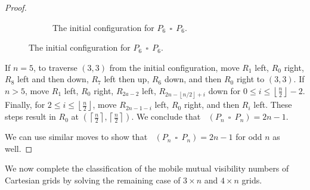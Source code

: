 \documentclass[a4paper,12pt]{article}
\DeclareMathOperator{\mobmv}{Mob_{\mu}}
\DeclareMathOperator{\cmob}{Mob^*_{gp}}
\DeclareMathOperator{\cp}{\,\square\,}
\theoremstyle{definition}
\begin{document}
\begin{proof}
\begin{figure}
\begin{subfigure}{.4\textwidth}
				\caption[justification=centering]{The initial configuration for $P_6 \cp P_6$.}
				\label{fig:a6r0initial}
			\end{subfigure}
		\end{figure}
		
		If $n = 5$, to traverse $(3,3)$ from the initial configuration, move $R_1$ left, $R_0$ right, $R_8$ left and then down, $R_7$ left then up, $R_6$ down, and then $R_0$ right to $(3,3)$. If $n > 5$, move $R_1$ left, $R_0$ right, $R_{2a-2}$ left, $R_{2n-\left \lfloor n/2 \right \rfloor+i}$ down for $0 \leq i \leq \left \lfloor\frac{n}{2}\right \rfloor - 2$. Finally, for $2 \leq i \leq \left \lfloor \frac{n}{2} \right \rfloor$, move $R_{2n-1-i}$ left, $R_0$ right, and then $R_i$ left. These steps result in $R_0$ at $(\left \lceil \frac{n}{2} \right \rceil, \left \lceil \frac{n}{2} \right \rceil)$. We conclude that $\mobmv(P_n \cp P_n) = 2n-1$.
		
		We can use similar moves to show that $\cmob(P_n \cp P_n) = 2n-1$ for odd $n$ as well.
	\end{proof}
	
	
	We now complete the classification of the mobile mutual visibility numbers of Cartesian grids by solving the remaining case of $3 \times n$ and $4 \times n$ grids.
	
\end{document}
